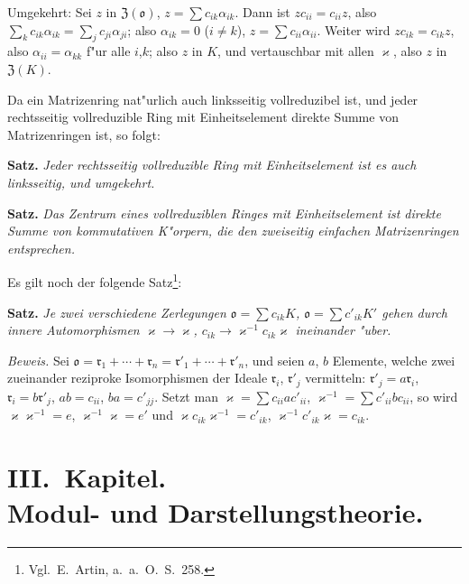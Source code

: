 \documentclass[12pt,a4paper]{article}
\theoremstyle{plain}
\begin{document}
Umgekehrt: Sei $z$ in $\mathfrak{Z}(\mathfrak{o})$, $z = \sum c_{ik}\alpha_{ik}$. Dann ist $zc_{ii} = c_{ii}z$, also $\sum_k c_{ik}\alpha_{ik} = \sum_j c_{ji}\alpha_{ji}$; also $\alpha_{ik} = 0$ ($i \neq k$), $z = \sum c_{ii}\alpha_{ii}$. Weiter wird $zc_{ik} = c_{ik}z$, also $\alpha_{ii} = \alpha_{kk}$ f"ur alle $i$,$k$; also $z$ in $K$, und vertauschbar mit allen $\varkappa$, also $z$ in $\mathfrak{Z}(K)$.

Da ein Matrizenring nat"urlich auch linksseitig vollreduzibel ist, und jeder rechtsseitig vollreduzible Ring mit Einheitselement direkte Summe von Matrizenringen ist, so folgt:

\medskip\noindent\textbf{Satz.}
\textit{Jeder rechtsseitig vollreduzible Ring mit Einheitselement ist es auch linksseitig, und umgekehrt.}

\medskip\noindent\textbf{Satz.}
\textit{Das Zentrum eines vollreduziblen Ringes mit Einheitselement ist direkte Summe von kommutativen K"orpern, die den zweiseitig einfachen Matrizenringen entsprechen.}

\medskip
Es gilt noch der folgende Satz\footnote{Vgl.\ E.\ Artin, a.\ a.\ O.\ S.\ 258.}:

\noindent\textbf{Satz.}
\textit{Je zwei verschiedene Zerlegungen $\mathfrak{o} = \sum c_{ik}K$, $\mathfrak{o} = \sum c'_{ik}K'$ gehen durch innere Automorphismen $\varkappa \to \varkappa$, $c_{ik} \to \varkappa^{-1}c_{ik}\varkappa$ ineinander "uber.}

\noindent\textit{Beweis.}
Sei $\mathfrak{o} = \mathfrak{r}_1 + \cdots + \mathfrak{r}_n = \mathfrak{r}'_1 + \cdots + \mathfrak{r}'_n$, und seien $a$, $b$ Elemente, welche zwei zueinander reziproke Isomorphismen der Ideale $\mathfrak{r}_i$, $\mathfrak{r}'_j$ vermitteln: $\mathfrak{r}'_j = a\mathfrak{r}_i$, $\mathfrak{r}_i = b\mathfrak{r}'_j$, $ab = c_{ii}$, $ba = c'_{jj}$. Setzt man $\varkappa = \sum c_{ii}ac'_{ii}$, $\varkappa^{-1} = \sum c'_{ii}bc_{ii}$, so wird $\varkappa\varkappa^{-1} = e$, $\varkappa^{-1}\varkappa = e'$ und $\varkappa c_{ik}\varkappa^{-1} = c'_{ik}$, $\varkappa^{-1} c'_{ik}\varkappa = c_{ik}$.

\newpage
\section*{III.\ Kapitel.\\[4pt] Modul- und Darstellungstheorie.}
\setcounter{section}{14}
\end{document}

